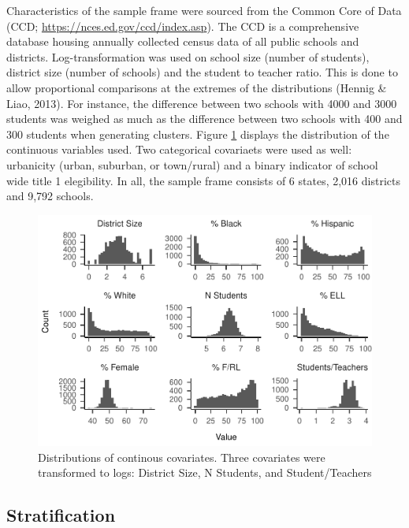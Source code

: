 \documentclass[man,floatsintext]{apa6}
\begin{document}
Characteristics of the sample frame were sourced from the Common Core of Data (CCD; \url{https://nces.ed.gov/ccd/index.asp}). The CCD is a comprehensive database housing annually collected census data of all public schools and districts. Log-transformation was used on school size (number of students), district size (number of schools) and the student to teacher ratio. This is done to allow proportional comparisons at the extremes of the distributions (Hennig \& Liao, 2013). For instance, the difference between two schools with 4000 and 3000 students was weighed as much as the difference between two schools with 400 and 300 students when generating clusters. Figure \ref{fig:plot-dist1} displays the distribution of the continuous variables used. Two categorical covariaets were used as well: urbanicity (urban, suburban, or town/rural) and a binary indicator of school wide title 1 elegibility. In all, the sample frame consists of 6 states, 2,016 districts and 9,792 schools.



\begin{figure}
\centering
\includegraphics{GenSamp-Paper_files/figure-latex/plot-dist1-1.pdf}
\caption{\label{fig:plot-dist1}Distributions of continous covariates. Three covariates were transformed to logs: District Size, N Students, and Student/Teachers}
\end{figure}

\hypertarget{stratification}{%
\subsection{Stratification}\label{stratification}}
\end{document}
